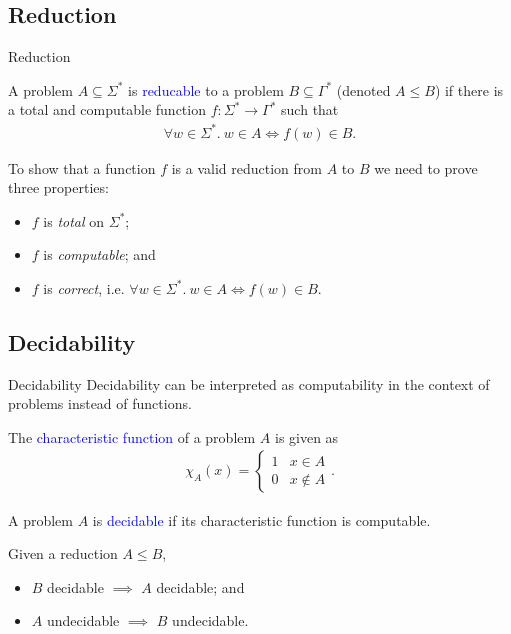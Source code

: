 \documentclass{beamer}
\theoremstyle{definition}
\def\spadding{\vspace{0.25cm}}
\def\b{\textcolor{blue}}
\begin{document}
\subsection{Reduction}

\begin{frame}{Reduction}
    \begin{definition}
        A problem $A \subseteq \Sigma^*$ is \b{reducable} to a problem $B \subseteq \Gamma^*$ (denoted $A \leq B$) if there is a total and computable function $f : \Sigma^* \to \Gamma^*$ such that \begin{align*}
            \forall w \in \Sigma^*.\ w \in A \iff f(w) \in B.
        \end{align*}
    \end{definition}\pause
    \begin{example}
        To show that a function $f$ is a valid reduction from $A$ to $B$ we need to prove three properties:\pause
        \begin{itemize}
            \item $f$ is \textit{total} on $\Sigma^*$\pause;
            \item $f$ is \textit{computable}\pause; and
            \item $f$ is \textit{correct}, i.e. $\forall w \in \Sigma^*.\ w \in A \iff f(w) \in B$.
        \end{itemize}
    \end{example}
\end{frame}

\subsection{Decidability}

\begin{frame}{Decidability}
    Decidability can be interpreted as computability in the context of problems instead of functions.\pause
    \begin{definition}
        The \b{characteristic function} of a problem $A$ is given as
        \begin{align*}
            \chi_A(x) = \begin{cases}
                            1 & x \in A \\
                            0 & x \not\in A
                        \end{cases}.
        \end{align*}
    \end{definition}\pause
    \begin{definition}
        A problem $A$ is \b{decidable} if its characteristic function is computable.
    \end{definition}\pause\spadding
    Given a reduction $A \leq B$,\pause
    \begin{itemize}
        \item $B$ decidable $\implies$ $A$ decidable\pause; and
        \item $A$ undecidable $\implies$ $B$ undecidable.
    \end{itemize}
\end{frame}
\end{document}
